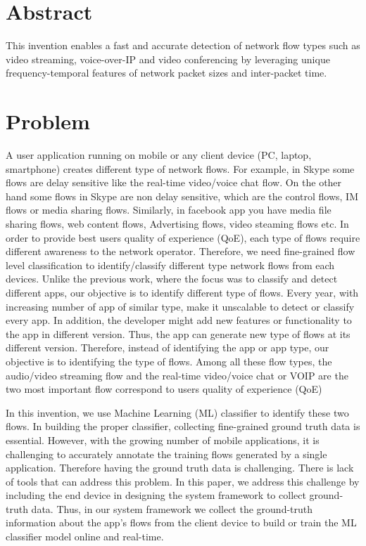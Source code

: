 \documentclass[12pt]{amsart}
\title{}
\author{}
\date{} %
\begin{document}
\section{Abstract}

This invention enables a fast and accurate detection of network flow types such as video streaming, voice-over-IP and video conferencing by leveraging unique frequency-temporal features of network packet sizes and inter-packet time. 

\section{Problem}

A user application running on mobile or any client device (PC, laptop, smartphone)
creates different type of network flows. For example, in Skype some flows are delay
sensitive like the real-time video/voice chat flow. On
the other hand some flows in Skype are non delay sensitive,
which are the control flows, IM flows or media sharing
flows. Similarly, in facebook app you have media file
sharing flows, web content flows, Advertising flows, video
steaming flows etc. In order to provide best users quality
of experience (QoE), each type of flows require different
awareness to the network operator. Therefore, we need fine-grained
flow level classification to identify/classify different
type network flows from each devices. Unlike the previous
work, where the focus was to classify and detect different
apps, our objective is to identify different type
of flows.
Every year, with increasing number of app of similar type,
make it unscalable to detect or classify every app. In addition,
the developer might add new features or functionality
to the app in different version. Thus, the app can generate
new type of flows at its different version. Therefore,
instead of identifying the app or app type, our objective is
to identifying the type of flows. Among all these flow types,
the audio/video streaming flow and the real-time video/voice
chat or VOIP are the two most important flow correspond to
users quality of experience (QoE)

In this invention, we use Machine Learning (ML) classifier to identify these two flows. In building
the proper classifier, collecting fine-grained ground truth data
is essential. However, with the growing number of mobile
applications, it is challenging to accurately annotate the training flows generated by a single application. Therefore having
the ground truth data is challenging. There is lack of tools
that can address this problem. In this paper, we address this
challenge by including the end device in designing the system
framework to collect ground-truth data. Thus, in our
system framework we collect the ground-truth information
about the app’s flows from the client device to build or train
the ML classifier model online and real-time. 
\end{document}
